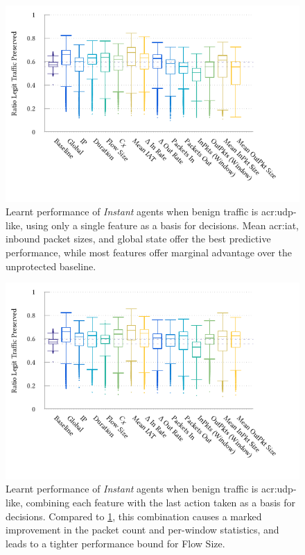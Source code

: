 \begin{figure}
	\centering
	\includegraphics[width=\linewidth]{plots/marl/ftprep-cap-box-thesis}
	\caption[Learnt performance of \emph{Instant} agents when benign traffic is UDP-like, using only a single feature as a basis for decisions.]{
		Learnt performance of \emph{Instant} agents when benign traffic is \gls{acr:udp}-like, using only a single feature as a basis for decisions.
		Mean \gls{acr:iat}, inbound packet sizes, and global state offer the best predictive performance, while most features offer marginal advantage over the unprotected baseline.
		\label{fig:udp-feature-plots}
	}
\end{figure}

\begin{figure}
	\centering
	\includegraphics[width=\linewidth]{plots/marl/ftprep-laf-cap-box-thesis}
	\caption[Learnt performance of \emph{Instant} agents when benign traffic is UDP-like, jointly tiling each feature with the last action taken.]{
		Learnt performance of \emph{Instant} agents when benign traffic is \gls{acr:udp}-like, combining each feature with the last action taken as a basis for decisions.
		Compared to \cref{fig:udp-feature-plots}, this combination causes a marked improvement in the packet count and per-window statistics, and leads to a tighter performance bound for Flow Size.
		\label{fig:udp-laf-feature-plots}
	}
\end{figure}

